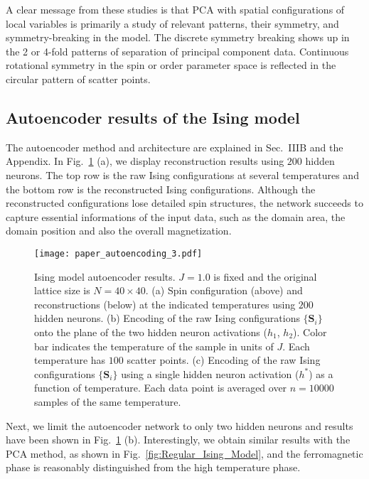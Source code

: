 \documentclass[pra,letterpaper,10pt,twocolumn]{revtex4}
\begin{document}
A clear message from these studies is that PCA with spatial
configurations of local variables is primarily a study of relevant
patterns, their symmetry, and symmetry-breaking in the model.  The
discrete symmetry breaking shows up in the 2 or 4-fold patterns of
separation of principal component data. Continuous rotational symmetry
in the spin or order parameter space is reflected in the circular
pattern of scatter points.

\subsection{Autoencoder results of the Ising model}

The autoencoder method and architecture are explained in Sec.~IIIB and
the Appendix.  In Fig.~\ref{fig:autoencoding_3} (a), we display
reconstruction results using $200$ hidden neurons. The top row is the
raw Ising configurations at several temperatures and the bottom row is
the reconstructed Ising configurations. Although the reconstructed
configurations lose detailed spin structures, the network succeeds to
capture essential informations of the input data, such as the domain
area, the domain position and also the overall magnetization.  

\begin{figure}[!h]
\texttt{[image: paper\_autoencoding\_3.pdf]}  
\caption{
Ising model autoencoder results. $J=1.0$ is fixed and the original lattice size is $N=40\times 40$. (a) Spin
configuration (above) and reconstructions (below) at the indicated
temperatures using $200$ hidden neurons. (b) Encoding of the raw Ising
configurations $\{\mathbf{S}_i\}$ onto the plane of the two hidden
neuron activations ($h_1$, $h_2$). Color bar indicates the temperature of the sample in units of
$J$. Each temperature has $100$ scatter points. (c) Encoding of the raw
Ising configurations $\{\mathbf{S}_i\}$ using a single hidden neuron activation ($h^*$) as
a function of temperature.  Each data point is averaged over $n=10000$
samples of the same temperature.
\label{fig:autoencoding_3}
}
\end{figure}

Next, we limit the autoencoder network to only two hidden neurons and
results have been shown in Fig.~\ref{fig:autoencoding_3} (b).
Interestingly, we obtain similar results with the PCA method, as shown
in Fig.~\ref{fig:Regular_Ising_Model}, and the ferromagnetic phase is
reasonably distinguished from the high temperature phase. 
\end{document}
